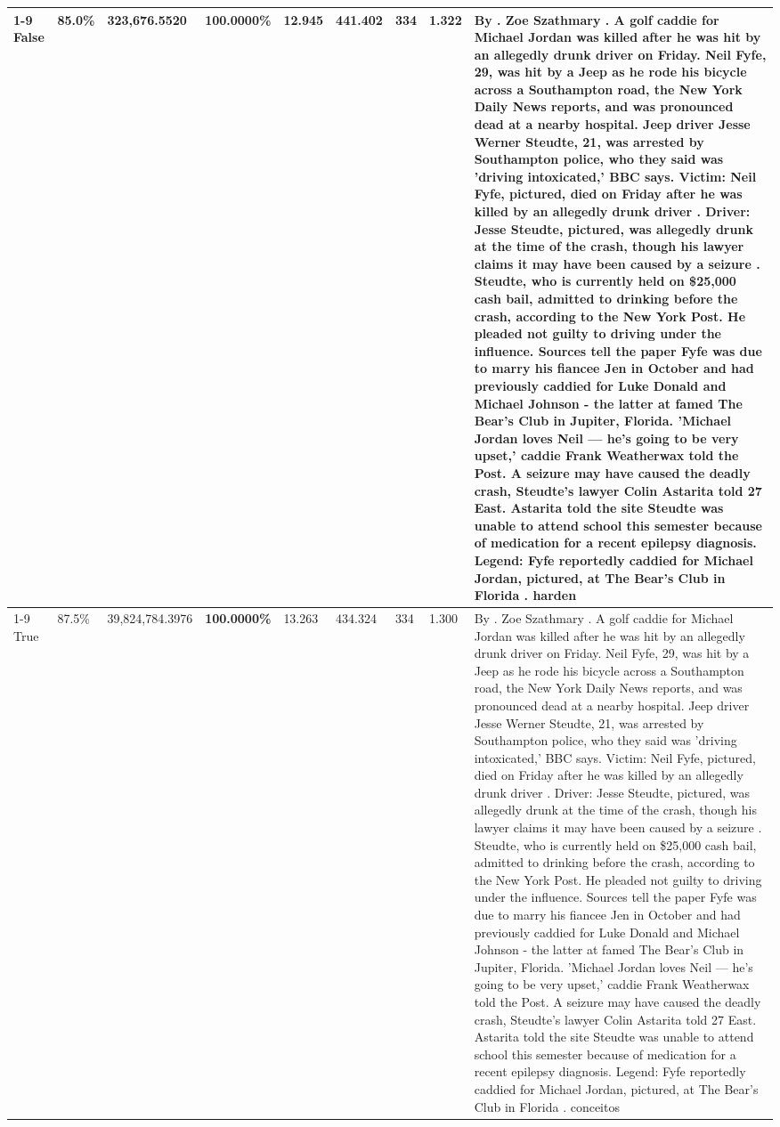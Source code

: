 \begin{table}[H]
\begin{tabular}{lllrlllll}
\cline{1-9}
False & 85.0\% & 323,676.5520 & \bfseries \color{red} 100.0000\% & \bfseries \color{red} 12.945 & 441.402 & 334 & 1.322 & By . Zoe Szathmary . A golf caddie for Michael Jordan was killed after he was hit by an allegedly drunk driver on Friday. Neil Fyfe, 29, was hit by a Jeep as he rode his bicycle across a Southampton road, the New York Daily News reports, and was pronounced dead at a nearby hospital. Jeep driver Jesse Werner Steudte, 21, was arrested by Southampton police, who they said was 'driving intoxicated,' BBC says. Victim: Neil Fyfe, pictured, died on Friday after he was killed by an allegedly drunk driver . Driver: Jesse Steudte, pictured, was allegedly drunk at the time of the crash, though his lawyer claims it may have been caused by a seizure . Steudte, who is currently held on \$25,000 cash bail, admitted to drinking before the crash, according to the New York Post. He pleaded not guilty to driving under the influence. Sources tell the paper Fyfe was due to marry his fiancee Jen in October and had previously caddied for Luke Donald and Michael Johnson - the latter at famed The Bear's Club in Jupiter, Florida. 'Michael Jordan loves Neil — he’s going to be very upset,' caddie Frank Weatherwax told the Post. A seizure may have caused the deadly crash, Steudte's lawyer Colin Astarita told 27 East. Astarita told the site Steudte was unable to attend school this semester because of medication for a recent epilepsy diagnosis. Legend: Fyfe reportedly caddied for Michael Jordan, pictured, at The Bear's Club in Florida . harden \\
\cline{1-9}
True & 87.5\% & 39,824,784.3976 & \bfseries \color{red} 100.0000\% & 13.263 & 434.324 & 334 & 1.300 & By . Zoe Szathmary . A golf caddie for Michael Jordan was killed after he was hit by an allegedly drunk driver on Friday. Neil Fyfe, 29, was hit by a Jeep as he rode his bicycle across a Southampton road, the New York Daily News reports, and was pronounced dead at a nearby hospital. Jeep driver Jesse Werner Steudte, 21, was arrested by Southampton police, who they said was 'driving intoxicated,' BBC says. Victim: Neil Fyfe, pictured, died on Friday after he was killed by an allegedly drunk driver . Driver: Jesse Steudte, pictured, was allegedly drunk at the time of the crash, though his lawyer claims it may have been caused by a seizure . Steudte, who is currently held on \$25,000 cash bail, admitted to drinking before the crash, according to the New York Post. He pleaded not guilty to driving under the influence. Sources tell the paper Fyfe was due to marry his fiancee Jen in October and had previously caddied for Luke Donald and Michael Johnson - the latter at famed The Bear's Club in Jupiter, Florida. 'Michael Jordan loves Neil — he’s going to be very upset,' caddie Frank Weatherwax told the Post. A seizure may have caused the deadly crash, Steudte's lawyer Colin Astarita told 27 East. Astarita told the site Steudte was unable to attend school this semester because of medication for a recent epilepsy diagnosis. Legend: Fyfe reportedly caddied for Michael Jordan, pictured, at The Bear's Club in Florida . conceitos \\

\end{tabular}
\end{table}
